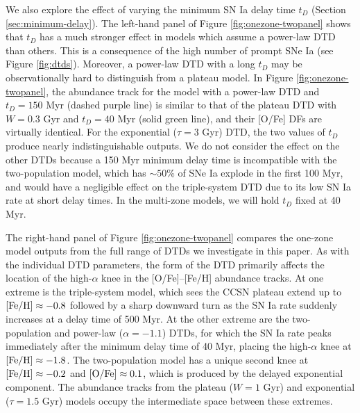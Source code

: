 \documentclass[twocolumn,twocolappendix,linenumbers]{aastex631}
\begin{document}
We also explore the effect of varying the minimum SN Ia delay time $t_D$ (Section \ref{sec:minimum-delay}).
The left-hand panel of Figure \ref{fig:onezone-twopanel} shows that $t_D$ has a much stronger effect in models which assume a power-law DTD than others. This is a consequence of the high number of prompt SNe Ia (see Figure \ref{fig:dtds}). Moreover, a power-law DTD with a long $t_D$ may be observationally hard to distinguish from a plateau model. In Figure \ref{fig:onezone-twopanel}, the abundance track for the model with a power-law DTD and $t_D=150$ Myr (dashed purple line) is similar to that of the plateau DTD with $W=0.3$ Gyr and $t_D=40$ Myr (solid green line), and their [O/Fe] DFs are virtually identical. For the exponential ($\tau=3$ Gyr) DTD, the two values of $t_D$ produce nearly indistinguishable outputs. We do not consider the effect on the other DTDs because a 150 Myr minimum delay time is incompatible with the two-population model, which has $\sim 50$\% of SNe Ia explode in the first 100 Myr, and would have a negligible effect on the triple-system DTD due to its low SN Ia rate at short delay times.
In the multi-zone models, we will hold $t_D$ fixed at 40 Myr.

The right-hand panel of Figure \ref{fig:onezone-twopanel} compares the one-zone model outputs from the full range of DTDs we investigate in this paper. As with the individual DTD parameters, the form of the DTD primarily affects the location of the high-$\alpha$ knee in the [O/Fe]--[Fe/H] abundance tracks. At one extreme is the triple-system model, which sees the CCSN plateau extend up to ${\rm [Fe/H]}\approx-0.8$ followed by a sharp downward turn as the SN Ia rate suddenly increases at a delay time of 500 Myr. 
At the other extreme are the two-population and power-law ($\alpha=-1.1$) DTDs, for which the SN Ia rate peaks immediately after the minimum delay time of 40 Myr, placing the high-$\alpha$ knee at ${\rm [Fe/H]}\approx-1.8$. The two-population model has a unique second knee at ${\rm [Fe/H]}\approx-0.2$ and ${\rm [O/Fe]}\approx0.1$, which is produced by the delayed exponential component. The abundance tracks from the plateau ($W=1$ Gyr) and exponential ($\tau=1.5$ Gyr) models occupy the intermediate space between these extremes. 
\end{document}
